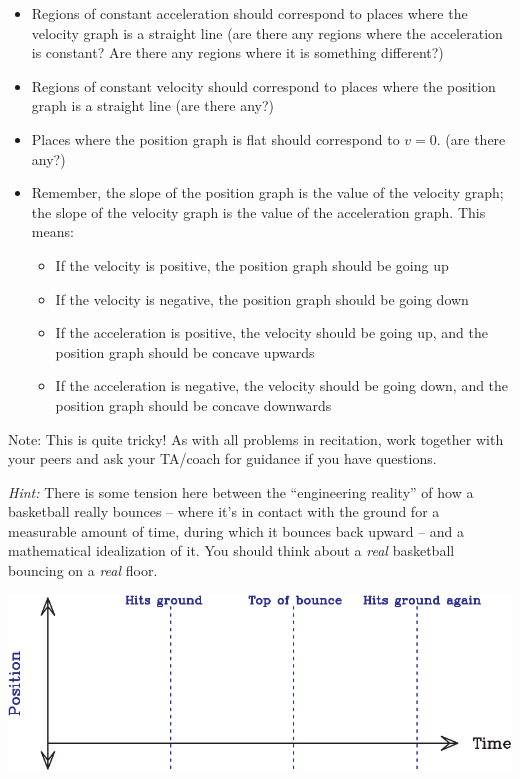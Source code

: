\documentclass[12pt]{article}
\newcommand{\BI}{\begin{itemize}}
\newcommand{\EI}{\end{itemize}}
\def\BS{\bigskip}
\begin{document}
\begin{enumerate}
\BI
    \item Regions of constant acceleration should correspond to places where the velocity graph is a straight line (are there any regions where the acceleration is constant? Are there any regions where it is something different?)
    \item Regions of constant velocity should correspond to places where the position graph is a straight line (are there any?)
    \item Places where the position graph is flat should correspond to $v=0$. (are there any?)
    \item Remember, the slope of the position graph is the value of the velocity graph; the slope of the velocity graph is the value of the acceleration graph. This means:
    \begin{itemize}
    	\item If the velocity is positive, the position graph should be going up
    	\item If the velocity is negative, the position graph should be going down
    	\item If the acceleration is positive, the velocity should be going up, and the position graph should be concave upwards
    	\item If the acceleration is negative, the velocity should be going down, and the position graph should be concave downwards
    \end{itemize}
\EI
     

Note: This is quite tricky! As with all problems in recitation, work together with your peers and ask your TA/coach for guidance if you have questions.

\BS\BS

{\it Hint:} There is some tension here between the ``engineering reality'' of how a basketball really bounces -- where it's in contact with the ground for a measurable amount of time, during which it bounces back upward
-- and a mathematical idealization of it. You should think about a {\it real} basketball bouncing on a {\it real} floor.

\newpage


\begin{center}
	\includegraphics[width=\textwidth]{position-crop.pdf}
	

\end{center}
\end{enumerate}
\end{document}

